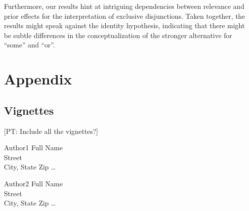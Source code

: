 \documentclass{sp}
\newcommand{\pt}[1]{\textcolor{Cerulean}{[PT: #1]}}
\begin{document}
Furthermore, our results hint at intriguing dependencies between relevance and prior effects for the interpretation of exclusive disjunctions. Taken together, the results might speak against the identity hypothesis, indicating that there might be subtle differences in the conceptualization of the stronger alternative for ``some'' and ``or''.

\section{Appendix}
\subsection{Vignettes}
\pt{Include all the vignettes?}



\begin{addresses}
  \begin{address}
    Author1 Full Name \\
    Street \\
    City, State Zip \ldots \\
  \end{address}
  \begin{address}
    Author2 Full Name \\
    Street \\
    City, State Zip \dots \\
  \end{address}
\end{addresses}
\end{document}

